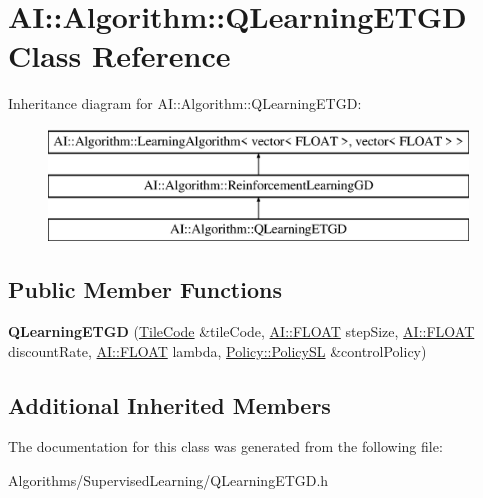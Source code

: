 \hypertarget{classAI_1_1Algorithm_1_1QLearningETGD}{\section{A\-I\-:\-:Algorithm\-:\-:Q\-Learning\-E\-T\-G\-D Class Reference}
\label{classAI_1_1Algorithm_1_1QLearningETGD}
}
Inheritance diagram for A\-I\-:\-:Algorithm\-:\-:Q\-Learning\-E\-T\-G\-D\-:\begin{figure}[H]
\begin{center}
\leavevmode
\includegraphics[height=3.000000cm]{classAI_1_1Algorithm_1_1QLearningETGD}
\end{center}
\end{figure}
\subsection*{Public Member Functions}
\begin{DoxyCompactItemize}
\item 
\hypertarget{classAI_1_1Algorithm_1_1QLearningETGD_ae36fe58b069fb5f9b36f4e7a5b3c8e09}{{\bfseries Q\-Learning\-E\-T\-G\-D} (\hyperlink{classAI_1_1Algorithm_1_1TileCode}{Tile\-Code} \&tile\-Code, \hyperlink{namespaceAI_a41b74884a20833db653dded3918e05c3}{A\-I\-::\-F\-L\-O\-A\-T} step\-Size, \hyperlink{namespaceAI_a41b74884a20833db653dded3918e05c3}{A\-I\-::\-F\-L\-O\-A\-T} discount\-Rate, \hyperlink{namespaceAI_a41b74884a20833db653dded3918e05c3}{A\-I\-::\-F\-L\-O\-A\-T} lambda, \hyperlink{classAI_1_1Algorithm_1_1Policy_1_1Policy}{Policy\-::\-Policy\-S\-L} \&control\-Policy)}\label{classAI_1_1Algorithm_1_1QLearningETGD_ae36fe58b069fb5f9b36f4e7a5b3c8e09}

\end{DoxyCompactItemize}
\subsection*{Additional Inherited Members}


The documentation for this class was generated from the following file\-:\begin{DoxyCompactItemize}
\item 
Algorithms/\-Supervised\-Learning/Q\-Learning\-E\-T\-G\-D.\-h\end{DoxyCompactItemize}
